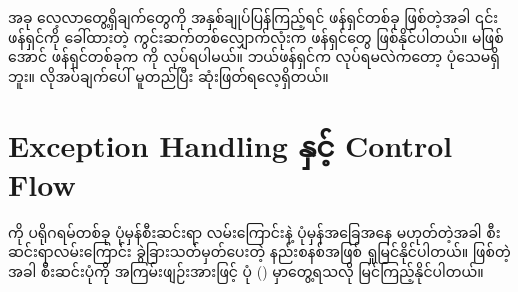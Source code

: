 အခု လေ့လာတွေ့ရှိချက်တွေကို အနှစ်ချုပ်ပြန်ကြည့်ရင် ဖန်ရှင်တစ်ခု  ဖြစ်တဲ့အခါ ၎င်းဖန်ရှင်ကို ခေါ်ထားတဲ့ ကွင်းဆက်တစ်လျှောက်လုံးက ဖန်ရှင်တွေ  ဖြစ်နိုင်ပါတယ်။  မဖြစ်အောင် ဖန်ရှင်တစ်ခုက  ကို  လုပ်ရပါမယ်။ ဘယ်ဖန်ရှင်က  လုပ်ရမလဲကတော့ ပုံသေမရှိဘူး။ လိုအပ်ချက်ပေါ် မူတည်ပြီး ဆုံးဖြတ်ရလေ့ရှိတယ်။






\section{Exception Handling  နှင့် Control Flow}
 ကို ပရိုဂရမ်တစ်ခု ပုံမှန်စီးဆင်းရာ လမ်းကြောင်းနဲ့ ပုံမှန်အခြေအနေ မဟုတ်တဲ့အခါ စီးဆင်းရာလမ်းကြောင်း ခွဲခြားသတ်မှတ်ပေးတဲ့ နည်းစနစ်အဖြစ် ရှုမြင်နိုင်ပါတယ်။  ဖြစ်တဲ့အခါ စီးဆင်းပုံကို အကြမ်းဖျဉ်းအားဖြင့် ပုံ (\fRefNo{\ref{fig:exphandling}}) မှာတွေ့ရသလို မြင်ကြည့်နိုင်ပါတယ်။


